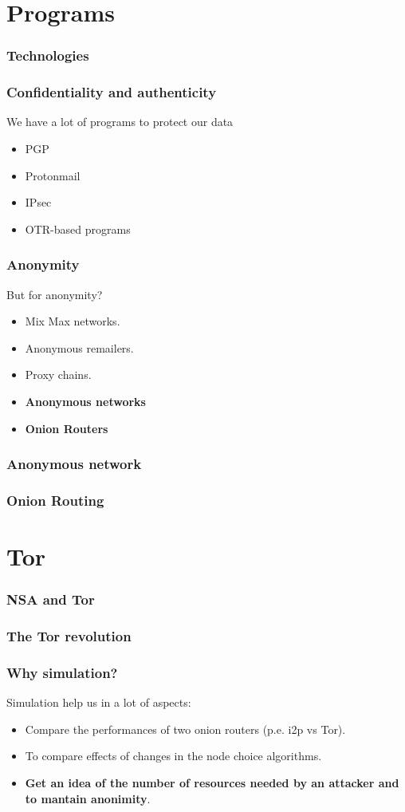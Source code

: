 \section{Programs}
\begin{frame}
	\frametitle{Technologies}
\end{frame}

\begin{frame}
	\frametitle{Confidentiality and authenticity}
	We have a lot of programs to protect our data
	\begin{itemize}
		\item PGP
		\item Protonmail
		\item IPsec
		\item OTR-based programs
	\end{itemize}
\end{frame}

\begin{frame}
	\frametitle{Anonymity}
	But for anonymity?
	\begin{itemize}
		\item Mix Max networks.
		\item Anonymous remailers.
		\item Proxy chains.
		\item \textbf{Anonymous networks}
		\item \textbf{Onion Routers}
	\end{itemize}
\end{frame}

\begin{frame}
	\frametitle{Anonymous network}
\end{frame}

\begin{frame}
	\frametitle{Onion Routing}
\end{frame}

\section{Tor}

\begin{frame}
	\frametitle{NSA and Tor}
\end{frame}

\begin{frame}
	\frametitle{The Tor revolution}
\end{frame}

\begin{frame}
	\frametitle{Why simulation?}
	Simulation help us in a lot of aspects:

	\begin{itemize}
		\item Compare the performances of two onion routers (p.e. i2p vs
		Tor).
		\item To compare effects of changes in the node choice
		algorithms.
		\item \textbf{Get an idea of the number of resources needed by an
		attacker and to mantain anonimity}.
	\end{itemize}
\end{frame}
